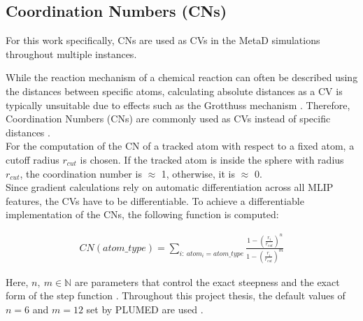 \subsection{Coordination Numbers (CNs)} \label{ch: ch2.2.3}

For this work specifically, CNs are used as CVs in the MetaD simulations throughout multiple instances.

While the reaction mechanism of a chemical reaction can often be described using the distances between specific atoms, calculating absolute distances as a CV is typically unsuitable due to effects such as the Grotthuss mechanism \cite{marx2010aqueous, batatia2024foundation}.
Therefore, Coordination Numbers (CNs) are commonly used as CVs instead of specific distances \cite{Laio2008}. \\
For the computation of the CN of a tracked atom with respect to a fixed atom, a cutoff radius $r_{cut}$ is chosen.
If the tracked atom is inside the sphere with radius $r_{cut}$, the coordination number is $\approx$ 1, otherwise, it is $\approx$ 0. \\
Since gradient calculations rely on automatic differentiation across all MLIP features, the CVs have to be differentiable.
To achieve a differentiable implementation of the CNs, the following function is computed:

\begin{align}
    CN(atom \_ type) = \sum_{i: \ atom_i = atom \_ type} \frac{1 - (\frac{r_i}{r_{cut}})^n}{1 - (\frac{r_i}{r_{cut}})^m}
\end{align}

Here, $n, \ m \in \mathbb{N}$ are parameters that control the exact steepness and the exact form of the step function \cite{Laio2008}.
Throughout this project thesis, the default values of $n=6$ and $m=12$ set by PLUMED are used \cite{plumed2014}\cite{plumed2019}. \\

